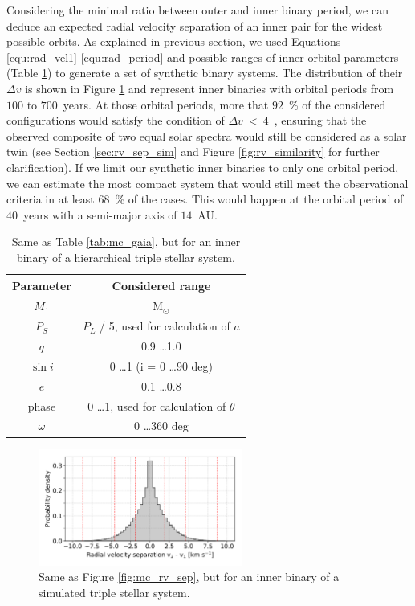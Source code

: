 Considering the minimal ratio between outer and inner binary period, we can deduce an expected radial velocity separation of an inner pair for the widest possible orbits. As explained in previous section, we used Equations \ref{equ:rad_vel1}-\ref{equ:rad_period} and possible ranges of inner orbital parameters (Table \ref{tab:mc_gaia_inner}) to generate a set of synthetic binary systems. The distribution of their $\Delta v$ is shown in Figure \ref{fig:mc_rv_sep_inner} and represent inner binaries with orbital periods from $100$ to $700$~years. At those orbital periods, more that $92$~\% of the considered configurations would satisfy the condition of $\Delta v$~<~4~\kms, ensuring that the observed composite of two equal solar spectra would still be considered as a solar twin (see Section \ref{sec:rv_sep_sim} and Figure \ref{fig:rv_similarity} for further clarification). If we limit our synthetic inner binaries to only one orbital period, we can estimate the most compact system that would still meet the observational criteria in at least $68$~\% of the cases. This would happen at the orbital period of $40$~years with a semi-major axis of $14$~AU. 

\begin{table}
	\centering
	\caption{Same as Table \ref{tab:mc_gaia}, but for an inner binary of a hierarchical triple stellar system.}
	\begin{tabular}{c | c}
		\hline
		Parameter & Considered range \\ 
		\hline
		$M_1$ & M$_{\odot}$ \\
		$P_S$ & $P_L$ / 5, used for calculation of $a$ \\
		$q$ & 0.9 \ldots 1.0 \\
		$\sin i$ & 0 \ldots 1 (i = 0 \ldots 90 deg)\\
		$e$ & 0.1 \ldots 0.8 \\
		phase & 0 \ldots 1, used for calculation of $\theta$ \\
		$\omega$ & 0 \ldots 360 deg \\
		\hline
	\end{tabular}
	\label{tab:mc_gaia_inner}
\end{table}

\begin{figure}
	\centering
	\includegraphics[width=0.6\textwidth]{MC_rv_from_sep_inner.png}
	\caption{Same as Figure \ref{fig:mc_rv_sep}, but for an inner binary of a simulated triple stellar system.}
	\label{fig:mc_rv_sep_inner}
\end{figure}

